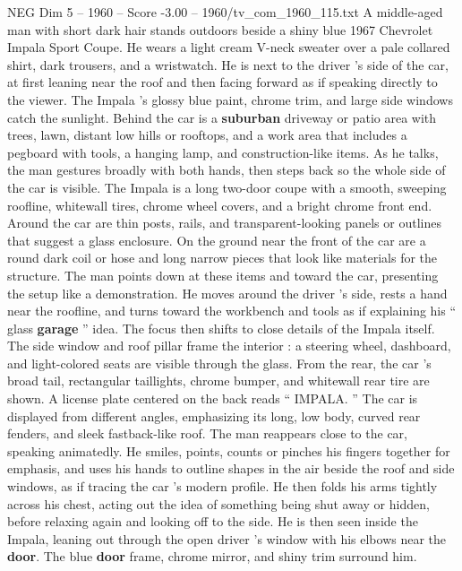 \begin{textsample}{NEG Dim 5 – 1960 – Score -3.00 – 1960/tv\_com\_1960\_115.txt}  \label{ex:f5_neg_041}
A middle-aged man with short dark hair stands outdoors beside a shiny blue 1967 Chevrolet Impala Sport Coupe.
He wears a light cream V-neck sweater over a pale collared shirt, dark trousers, and a wristwatch.
He is next to the driver ’s side of the car, at first leaning near the roof and then facing forward as if speaking directly to the viewer.
The Impala ’s glossy blue paint, chrome trim, and large side windows catch the sunlight.
Behind the car is a \textbf{suburban} driveway or patio area with trees, lawn, distant low hills or rooftops, and a work area that includes a pegboard with tools, a hanging lamp, and construction-like items.
As he talks, the man gestures broadly with both hands, then steps back so the whole side of the car is visible.
The Impala is a long two-door coupe with a smooth, sweeping roofline, whitewall tires, chrome wheel covers, and a bright chrome front end.
Around the car are thin posts, rails, and transparent-looking panels or outlines that suggest a glass enclosure.
On the ground near the front of the car are a round dark coil or hose and long narrow pieces that look like materials for the structure.
The man points down at these items and toward the car, presenting the setup like a demonstration.
He moves around the driver ’s side, rests a hand near the roofline, and turns toward the workbench and tools as if explaining his “ glass \textbf{garage} ” idea.
The focus then shifts to close details of the Impala itself.
The side window and roof pillar frame the interior : a steering wheel, dashboard, and light-colored seats are visible through the glass.
From the rear, the car ’s broad tail, rectangular taillights, chrome bumper, and whitewall rear tire are shown.
A license plate centered on the back reads “ IMPALA. ” The car is displayed from different angles, emphasizing its long, low body, curved rear fenders, and sleek fastback-like roof.
The man reappears close to the car, speaking animatedly.
He smiles, points, counts or pinches his fingers together for emphasis, and uses his hands to outline shapes in the air beside the roof and side windows, as if tracing the car ’s modern profile.
He then folds his arms tightly across his chest, acting out the idea of something being shut away or hidden, before relaxing again and looking off to the side.
He is then seen inside the Impala, leaning out through the open driver ’s window with his elbows near the \textbf{door}.
The blue \textbf{door} frame, chrome mirror, and shiny trim surround him.

\end{textsample}
